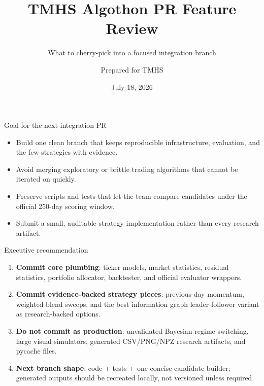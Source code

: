 \documentclass[aspectratio=169]{beamer}
\title{TMHS Algothon PR Feature Review}
\subtitle{What to cherry-pick into a focused integration branch}
\author{Prepared for TMHS}
\date{July 18, 2026}
\begin{document}
\begin{frame}
  \titlepage
\end{frame}

\begin{frame}{Goal for the next integration PR}
\begin{itemize}
  \item Build one clean branch that keeps reproducible infrastructure, evaluation, and the few strategies with evidence.
  \item Avoid merging exploratory or brittle trading algorithms that cannot be iterated on quickly.
  \item Preserve scripts and tests that let the team compare candidates under the official 250-day scoring window.
  \item Submit a small, auditable strategy implementation rather than every research artifact.
\end{itemize}
\end{frame}

\begin{frame}{Executive recommendation}
\begin{enumerate}
  \item \textbf{Commit core plumbing}: ticker models, market statistics, residual statistics, portfolio allocator, backtester, and official evaluator wrappers.
  \item \textbf{Commit evidence-backed strategy pieces}: previous-day momentum, weighted blend sweeps, and the best information graph leader-follower variant as research-backed options.
  \item \textbf{Do not commit as production}: unvalidated Bayesian regime switching, large visual simulators, generated CSV/PNG/NPZ research artifacts, and pycache files.
  \item \textbf{Next branch shape}: code + tests + one concise candidate builder; generated outputs should be recreated locally, not versioned unless required.
\end{enumerate}
\end{frame}
\end{document}
